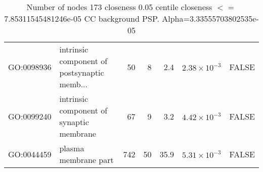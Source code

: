 \begin{table}[ht]
\begin{adjustbox}{max width=\textwidth}
\begin{tabular}{llrrrrl}
  GO:0098936 & intrinsic component of postsynaptic memb... & 50 & 8 & 2.4 & $2.38 \times 10^{-3}$ & FALSE \\ 
  GO:0099240 & intrinsic component of synaptic membrane & 67 & 9 & 3.2 & $4.42 \times 10^{-3}$ & FALSE \\ 
  GO:0044459 & plasma membrane part & 742 & 50 & 35.9 & $5.31 \times 10^{-3}$ & FALSE \\ 
   \hline
\end{tabular}
\end{adjustbox}
\caption{Number of nodes 173 closeness 0.05 centile  closeness $<=$ 7.85311545481246e-05 CC background PSP. Alpha=3.33555703802535e-05} 
\label{tab:Number of nodes 173 closeness 0.05 centile  closeness $<=$ 7.85311545481246e-05 CC background PSP. Alpha=3.33555703802535e-05}
\end{table}





